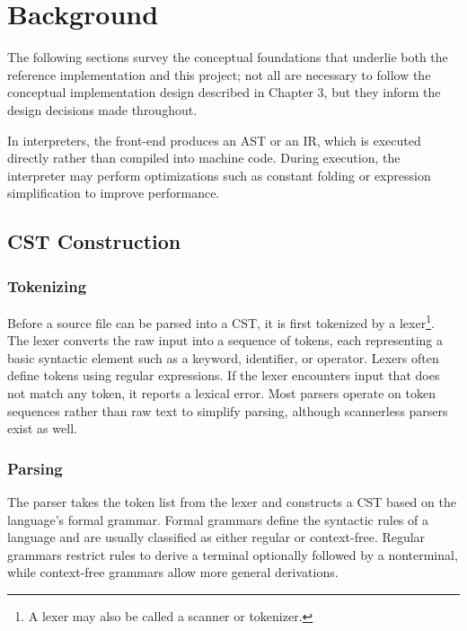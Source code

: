 \chapter{Background}

The following sections survey the conceptual foundations that underlie both the reference implementation and this project; not all are necessary to follow the conceptual implementation design described in Chapter 3, but they inform the design decisions made throughout.

In interpreters, the front-end produces an \ac{AST} or an \acf{IR}, which is executed directly rather than compiled into machine code. During execution, the interpreter may perform optimizations such as constant folding or expression simplification to improve performance.

\section{\acf{CST} Construction}

\subsection{Tokenizing}

Before a source file can be parsed into a \ac{CST}, it is first tokenized by a lexer\footnote{A lexer may also be called a scanner or tokenizer.}. The lexer converts the raw input into a sequence of tokens, each representing a basic syntactic element such as a keyword, identifier, or operator. Lexers often define tokens using regular expressions. If the lexer encounters input that does not match any token, it reports a lexical error. Most parsers operate on token sequences rather than raw text to simplify parsing, although scannerless parsers exist as well\cite{tomassetti2017}.

\subsection{Parsing}

The parser takes the token list from the lexer and constructs a \ac{CST} based on the language's formal grammar. Formal grammars define the syntactic rules of a language and are usually classified as either regular or context-free\cite{tomassetti2017}. Regular grammars restrict rules to derive a terminal optionally followed by a nonterminal, while context-free grammars allow more general derivations\cite{greenlaw1998, hanus2020}.  


